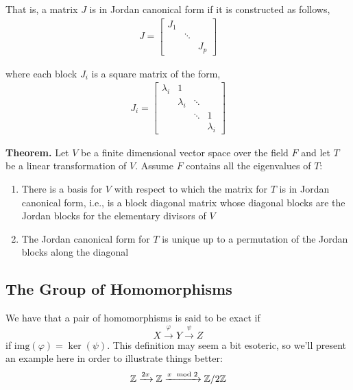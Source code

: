 \documentclass[11pt, reqno]{amsart}
\theoremstyle{plain}
\theoremstyle{definition}
\theoremstyle{example}
\begin{document}
That is, a matrix $J$ is in Jordan canonical form if it is constructed as follows,
\begin{align*}
J = \begin{bmatrix}
J_1 & \;     & \; \\
\;  & \ddots & \; \\ 
\;  & \;     & J_p\end{bmatrix}
\end{align*}

where each block $J_i$ is a square matrix of the form,
\begin{align*}
J_i = \begin{bmatrix}
\lambda_i & 1            & \;     & \;  \\
\;        & \lambda_i    & \ddots & \;  \\
\;        & \;           & \ddots & 1   \\
\;        & \;           & \;     & \lambda_i       
\end{bmatrix}
\end{align*}

\par
\textbf{Theorem.} Let $V$ be a finite dimensional vector space over the field $F$ and let $T$ be a linear transformation of $V$. Assume $F$ contains all the eigenvalues of $T$:
\begin{enumerate}
\item There is a basis for $V$ with respect to which the matrix for $T$ is in Jordan canonical form, i.e., is a block diagonal matrix whose diagonal blocks are the Jordan blocks for the elementary divisors of $V$
\item The Jordan canonical form for $T$ is unique up to a permutation of the Jordan blocks along the diagonal
\end{enumerate}


\subsection{The Group of Homomorphisms}

We have that a pair of homomorphisms is said to be exact if $$X \xrightarrow{\varphi} Y \xrightarrow{\psi} Z$$ if $\text{img}(\varphi) = \ker(\psi)$. This definition may seem a bit esoteric, so we'll present an example here in order to illustrate things better:
\begin{align*}
\mathbb{Z} \xrightarrow{2x} \mathbb{Z} \xrightarrow{x \mod 2} \mathbb{Z}/2\mathbb{Z}
\end{align*}
\end{document}
